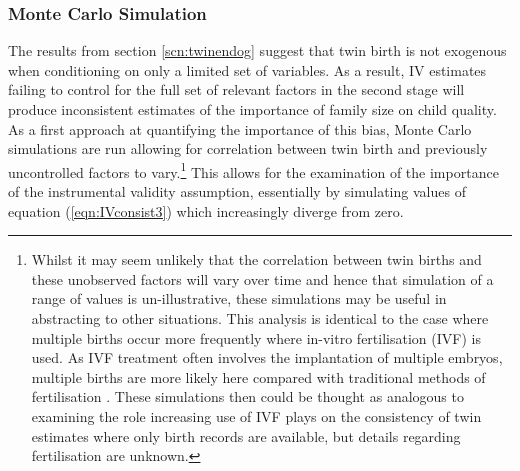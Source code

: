 \documentclass{article}[11pt,subeqn]
\begin{document}
\begin{spacing}{1.5}
\subsubsection{Monte Carlo Simulation}
\label{scn:MCS}
The results from section \ref{scn:twinendog} suggest that twin birth is not exogenous when conditioning on only a limited set of variables. As a result, 
IV estimates failing to control for the full set of 
relevant factors in the second stage will produce inconsistent estimates of the importance of family size on child quality.  As a first 
approach at quantifying the importance of this bias, Monte Carlo simulations are run allowing for correlation between twin birth and previously uncontrolled factors
to vary.\footnote{Whilst it may seem unlikely that the correlation between twin births and these unobserved factors will vary over time and hence that
simulation of a range of values is un-illustrative, these simulations may be useful in abstracting to other situations.  This analysis is identical to the
case where multiple births occur more frequently where in-vitro fertilisation (IVF) is used.  As IVF treatment often involves the implantation of 
multiple embryos, multiple births are more likely here compared with traditional methods of fertilisation \citep{Beraletal1990}.  These simulations then could be 
thought as analogous to examining the role increasing use of IVF plays on the consistency of twin estimates where only birth records are available, 
but details regarding fertilisation are unknown.}  This allows for the examination of the importance of the instrumental validity assumption, essentially
by simulating values of equation (\ref{eqn:IVconsist3}) which increasingly diverge from zero. 


\end{spacing}
\end{document}
